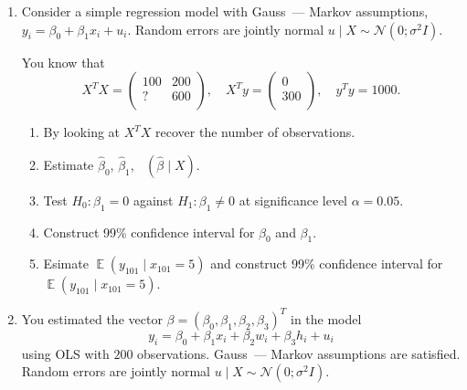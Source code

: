 \documentclass[12pt]{article}
\DeclareMathOperator{\hVar}{\widehat{\mathbb{V}ar}}
\DeclareMathOperator{\E}{\mathbb{E}}
\newcommand \cN{\mathcal{N}}
\newcommand{\hb}{\hat\beta}
\begin{document}
\begin{enumerate}
    \item Consider a simple regression model with Gauss~— Markov assumptions, $y_i = \beta_0 + \beta_1 x_i + u_i$.
    Random errors are jointly normal $u \mid X \sim \cN(0; \sigma^2 I)$.

    You know that 
    \[
    X^TX = \begin{pmatrix}
        100 & 200 \\
        ? & 600 \\
    \end{pmatrix}, \quad X^T y = \begin{pmatrix}
        0 \\
        300 \\
    \end{pmatrix}, \quad y^T y = 1000.
    \]
    \begin{enumerate}
        \item By looking at $X^TX$ recover the number of observations. 
        \item Estimate $\hb_0$, $\hb_1$, $\hVar(\hb \mid X)$.
        \item Test $H_0: \beta_1 = 0$ against $H_1: \beta_1 \neq 0$ at significance level $\alpha = 0.05$.
        \item Construct 99\% confidence interval for $\beta_0$ and $\beta_1$.
        \item Esimate $\E(y_{101} \mid x_{101} = 5)$ and construct 99\% confidence interval for $\E(y_{101} \mid x_{101} = 5)$.
    \end{enumerate}

    \item You estimated the vector $\beta = (\beta_0, \beta_1, \beta_2, \beta_3)^T$ in the model 
    \[
    y_i = \beta_0 + \beta_1 x_i + \beta_2 w_i + \beta_3 h_i + u_i
    \]
    using OLS with $200$ observations. 
    Gauss~— Markov assumptions are satisfied. 
    Random errors are jointly normal $u \mid X \sim \cN(0; \sigma^2 I)$.


\end{enumerate}
\end{document}

